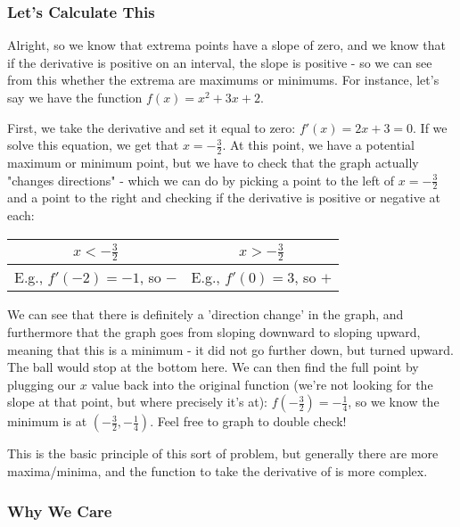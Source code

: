 \subsubsection{Let's Calculate This}

Alright, so we know that extrema points have a slope of zero, and we know that if the derivative is positive on an interval, the slope is positive - so we can see from this whether the extrema are maximums or minimums. For instance, let's say we have the function $f(x) = x^2+3x+2$.

First, we take the derivative and set it equal to zero: $f'(x) = 2x + 3 = 0$. If we solve this equation, we get that $x = -\frac{3}{2}$. At this point, we have a potential maximum or minimum point, but we have to check that the graph actually "changes directions" - which we can do by picking a point to the left of $x=-\frac{3}{2}$ and a point to the right and checking if the derivative is positive or negative at each:

\begin{center}
    \begin{tabular}{c|c}
        $x<-\frac{3}{2}$ & $x>-\frac{3}{2}$ \\
         \hline
        E.g., $f'(-2) = -1$, so $-$ & E.g., $f'(0) = 3$, so $+$ 
    \end{tabular}
\end{center}

We can see that there is definitely a 'direction change' in the graph, and furthermore that the graph goes from sloping downward to sloping upward, meaning that this is a minimum - it did not go further down, but turned upward. The ball would stop at the bottom here. We can then find the full point by plugging our $x$ value back into the original function (we're not looking for the slope at that point, but where precisely it's at): $f(-\frac{3}{2}) = -\frac{1}{4}$, so we know the minimum is at $(-\frac{3}{2}, -\frac{1}{4})$. Feel free to graph to double check!

This is the basic principle of this sort of problem, but generally there are more maxima/minima, and the function to take the derivative of is more complex.

\subsubsection{Why We Care}

